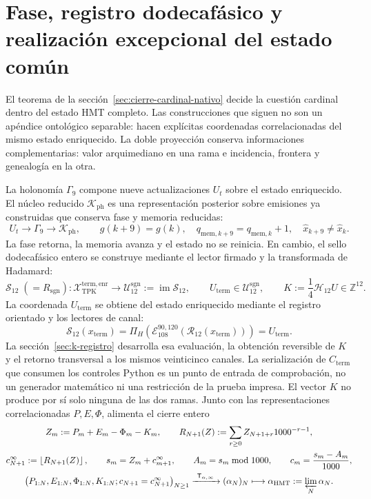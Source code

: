 \section{Fase, registro dodecafásico y realización excepcional del estado común}
\label{sec:testigos-descendentes-ch}

El teorema de la sección~\ref{sec:cierre-cardinal-nativo} decide la cuestión
cardinal dentro del estado HMT completo. Las construcciones que siguen no son
un apéndice ontológico separable: hacen explícitas coordenadas correlacionadas
del mismo estado enriquecido. La doble proyección conserva informaciones
complementarias: valor arquimediano en una rama e incidencia, frontera y
genealogía en la otra.

La holonomía \(\Gamma_9\) compone nueve actualizaciones \(U_t\) sobre el estado
enriquecido. El núcleo reducido \(\mathcal K_{\mathrm{ph}}\) es una representación
posterior sobre emisiones ya construidas que conserva fase y memoria reducidas:
\[
 U_t\longrightarrow\Gamma_9\longrightarrow\mathcal K_{\mathrm{ph}},
 \qquad
 g(k+9)=g(k),\quad
 q_{\mathrm{mem},k+9}=q_{\mathrm{mem},k}+1,\quad
 \widehat x_{k+9}\neq\widehat x_k.
\]
La fase retorna, la memoria avanza y el estado no se reinicia. En cambio, el
sello dodecafásico entero se construye mediante el lector firmado y la
transformada de Hadamard:
\[
 \mathcal S_{12}\;(=R_{\mathrm{sgn}}):
 \mathcal X_{\mathrm{TPK}}^{\mathrm{term,enr}}
 \longrightarrow
 \mathcal U_{12}^{\mathrm{sgn}}:=\operatorname{im}\mathcal S_{12},
 \qquad
 U_{\mathrm{term}}\in\mathcal U_{12}^{\mathrm{sgn}},
 \qquad
 K:=\frac14\mathcal H_{12}U\in\mathbb Z^{12}.
\]
La coordenada \(U_{\mathrm{term}}\) se obtiene del estado enriquecido mediante
el registro orientado y los lectores de canal:
\[
 \mathcal S_{12}(x_{\mathrm{term}})
 =\Pi_H\!\left(
   \mathcal E_{108}^{90,120}
   (\mathcal R_{12}(x_{\mathrm{term}}))\right)
 =U_{\mathrm{term}}.
\]
La sección~\ref{sec:k-registro} desarrolla esa evaluación, la obtención
reversible de \(K\) y el retorno transversal a los mismos veinticinco canales.
La serialización de \(C_{\mathrm{term}}\) que consumen los controles Python es
un punto de entrada de comprobación, no un generador matemático ni una
restricción de la prueba impresa.
El vector \(K\) no produce por sí solo ninguna de las dos ramas. Junto con
las representaciones correlacionadas \(P,E,\Phi\), alimenta el cierre entero
\[
 \begin{gathered}
 Z_m:=P_m+E_m-\Phi_m-K_m,\qquad
 R_{N+1}(Z):=\sum_{r\geq0}Z_{N+1+r}1000^{-r-1},\\
 c_{N+1}^{\infty}:=\left\lfloor R_{N+1}(Z)\right\rfloor,\qquad
 s_m=Z_m+c_{m+1}^{\infty},\qquad
 A_m=s_m\bmod1000,\qquad
 c_m=\frac{s_m-A_m}{1000},\\
 \bigl(P_{1:N},E_{1:N},\Phi_{1:N},K_{1:N};
       c_{N+1}=c_{N+1}^{\infty}\bigr)_{N\geq1}
 \xrightarrow{\ \mathsf T_{\alpha,\infty}\ }
 (\alpha_N)_N
 \longmapsto
 \alpha_{\mathrm{HMT}}:=\varprojlim_N\alpha_N.
 \end{gathered}
\]
